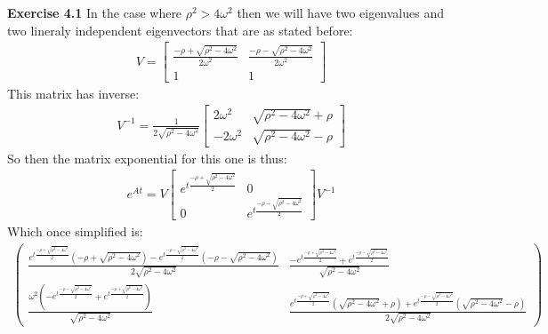 \documentclass[12pt]{article}
\newenvironment{exercise}[1]{\vspace{.1in}\noindent\textbf{Exercise #1 \hspace{.05em}}}{}
\theoremstyle{definition}
\theoremstyle{remark}
\begin{document}
\begin{exercise}{4.1}
	In the case where $\rho^2>4\omega^2$ then we will have two eigenvalues and two lineraly independent eigenvectors that are as stated before:
	\begin{align}
		V=\begin{bmatrix}
			  \frac{-\rho+\sqrt{\rho^2-4\omega^2}}{2\omega^2} & \frac{-\rho-\sqrt{\rho^2-4\omega^2}}{2\omega^2} \\
			  1                                               & 1
		  \end{bmatrix}
	\end{align}
	This matrix has inverse:
	\begin{align}
		V^{-1}=\frac{1}{2\sqrt{\rho^2-4\omega^2}}
		\begin{bmatrix}
			2\omega^2  & \sqrt{\rho^2-4\omega^2}+\rho  \\
			-2\omega^2 & \sqrt{\rho^2-4\omega^2} -\rho
		\end{bmatrix}
	\end{align}
	So then the matrix exponential for this one is thus:
	\begin{align}
		e^{At}=V %
		\begin{bmatrix}
			e^{t\frac{-\rho + \sqrt{\rho^2-4\omega^2}}{2}
			} & 0                                             \\
			0 & e^{t\frac{-\rho - \sqrt{\rho^2-4\omega^2}}{2}
				}
		\end{bmatrix}V^{-1}
	\end{align}
	Which once simplified is:
	\begin{align}
		\begin{pmatrix}\frac{e^{t\frac{-\rho+\sqrt{\rho^2-4\omega^2}}{2}}\left(-\rho+\sqrt{\rho^2-4\omega^2}\right)-e^{t\frac{-\rho-\sqrt{\rho^2-4\omega^2}}{2}}\left(-\rho-\sqrt{\rho^2-4\omega^2}\right)}{2\sqrt{\rho^2-4\omega^2}} & \frac{-e^{t\frac{-\rho+\sqrt{\rho^2-4\omega^2}}{2}}+e^{t\frac{-\rho-\sqrt{\rho^2-4\omega^2}}{2}}}{\sqrt{\rho^2-4\omega^2}}                                                                                   \\
               \frac{\omega^2\left(-e^{t\frac{-\rho-\sqrt{\rho^2-4\omega^2}}{2}}+e^{t\frac{-\rho+\sqrt{\rho^2-4\omega^2}}{2}}\right)}{\sqrt{\rho^2-4\omega^2}}                                                                & \frac{e^{t\frac{-\rho+\sqrt{\rho^2-4\omega^2}}{2}}\left(\sqrt{\rho^2-4\omega^2}+\rho\right)+e^{t\frac{-\rho-\sqrt{\rho^2-4\omega^2}}{2}}\left(\sqrt{\rho^2-4\omega^2}-\rho\right)}{2\sqrt{\rho^2-4\omega^2}}\end{pmatrix}
	\end{align}


\end{exercise}
\end{document}

